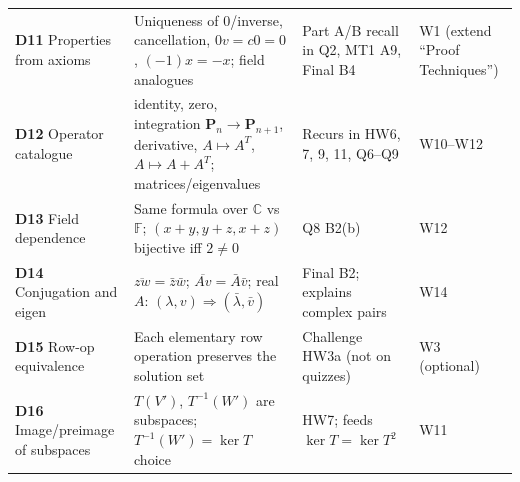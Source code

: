 {\begin{longtable}{@{}p{2.6cm}p{5.6cm}p{4.6cm}p{3.6cm}@{}}
\textbf{D11} Properties from axioms & Uniqueness of $0$/inverse, cancellation, $0v=c0=0$, $(-1)x=-x$; field analogues & Part A/B recall in Q2, MT1 A9, Final B4 & W1 (extend ``Proof Techniques'')\\
\textbf{D12} Operator catalogue & identity, zero, integration $\mathbf P_n\to\mathbf P_{n+1}$, derivative, $A\mapsto A^T$, $A\mapsto A+A^T$; matrices/eigenvalues & Recurs in HW6, 7, 9, 11, Q6--Q9 & W10--W12\\
\textbf{D13} Field dependence & Same formula over $\mathbb C$ vs $\mathbb F$; $(x{+}y,y{+}z,x{+}z)$ bijective iff $2\ne0$ & Q8 B2(b) & W12\\
\textbf{D14} Conjugation and eigen & $\overline{zw}=\bar z\bar w$; $\overline{Av}=\bar A\bar v$; real $A$: $(\lambda,v)\Rightarrow(\bar\lambda,\bar v)$ & Final B2; explains complex pairs & W14\\
\textbf{D15} Row-op equivalence & Each elementary row operation preserves the solution set & Challenge HW3a (not on quizzes) & W3 (optional)\\
\textbf{D16} Image/preimage of subspaces & $T(V')$, $T^{-1}(W')$ are subspaces; $T^{-1}(W')=\ker T$ choice & HW7; feeds $\ker T=\ker T^2$ & W11\\\bottomrule
\end{longtable}}
